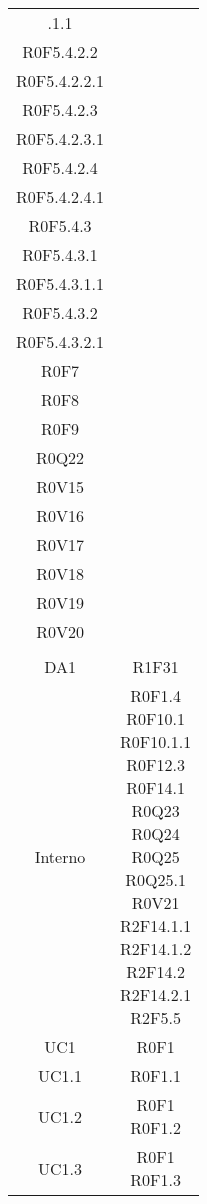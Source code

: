 \begin{center}
\begin{longtable}{|c|c|}
.1.1 \\R0F5.4.2.2 \\R0F5.4.2.2.1 \\R0F5.4.2.3 \\R0F5.4.2.3.1 \\R0F5.4.2.4 \\R0F5.4.2.4.1 \\R0F5.4.3 \\R0F5.4.3.1 \\R0F5.4.3.1.1 \\R0F5.4.3.2 \\R0F5.4.3.2.1 \\R0F7 \\R0F8 \\R0F9 \\R0Q22 \\R0V15 \\R0V16 \\R0V17 \\R0V18 \\R0V19 \\R0V20 \\}\\  
\hline
DA1 & \parbox[t]{\dimFonti}{R1F31 \\}\\  
\hline
Interno & \parbox[t]{\dimFonti}{R0F1.4 \\R0F10.1 \\R0F10.1.1 \\R0F12.3 \\R0F14.1 \\R0Q23 \\R0Q24 \\R0Q25 \\R0Q25.1 \\R0V21 \\R2F14.1.1 \\R2F14.1.2 \\R2F14.2 \\R2F14.2.1 \\R2F5.5 \\}\\  
\hline
UC1 & \parbox[t]{\dimFonti}{R0F1 \\}\\  
\hline
UC1.1 & \parbox[t]{\dimFonti}{R0F1.1 \\}\\  
\hline
UC1.2 & \parbox[t]{\dimFonti}{R0F1 \\R0F1.2 \\}\\  
\hline
UC1.3 & \parbox[t]{\dimFonti}{R0F1 \\R0F1.3 \\}\\  

\end{longtable}
\end{center}
